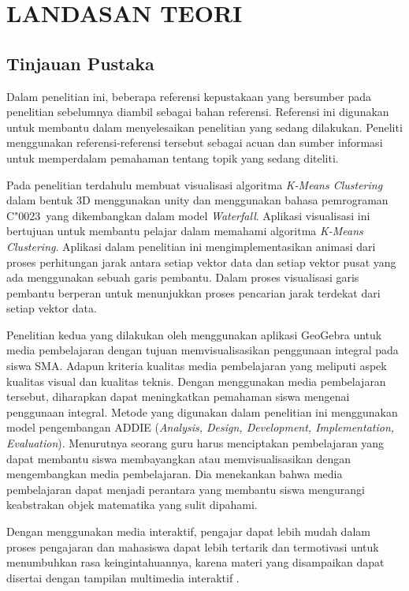 \chapter{LANDASAN TEORI}
\section{Tinjauan Pustaka}
Dalam penelitian ini, beberapa referensi kepustakaan yang bersumber pada penelitian sebelumnya diambil sebagai bahan referensi. Referensi ini digunakan untuk membantu dalam menyelesaikan penelitian yang sedang dilakukan. Peneliti menggunakan referensi-referensi tersebut sebagai acuan dan sumber informasi untuk memperdalam pemahaman tentang topik yang sedang diteliti.

Pada penelitian terdahulu \textcite{suryadibrata2020visualisasi} membuat visualisasi algoritma \textit{K-Means Clustering} dalam bentuk 3D menggunakan unity dan menggunakan bahasa pemrograman C\char"0023\ yang dikembangkan dalam model \textit{Waterfall}. Aplikasi visualisasi ini bertujuan untuk membantu pelajar dalam memahami algoritma \textit{K-Means Clustering}. Aplikasi dalam penelitian ini mengimplementasikan animasi dari proses perhitungan jarak antara setiap vektor data dan setiap vektor pusat yang ada menggunakan sebuah garis pembantu. Dalam proses visualisasi garis pembantu berperan untuk menunjukkan proses pencarian jarak terdekat dari setiap vektor data.

Penelitian kedua yang dilakukan oleh \textcite{zarkasyi2015pengembangan} menggunakan aplikasi GeoGebra untuk media pembelajaran dengan tujuan memvisualisasikan penggunaan integral pada siswa SMA. Adapun kriteria kualitas media pembelajaran yang meliputi aspek kualitas visual dan kualitas teknis. Dengan menggunakan media pembelajaran tersebut, diharapkan dapat meningkatkan pemahaman siswa mengenai penggunaan integral. Metode yang digunakan dalam penelitian ini menggunakan model pengembangan ADDIE (\textit{Analysis, Design, Development, Implementation, Evaluation}). Menurutnya seorang guru harus menciptakan pembelajaran yang dapat membantu siswa membayangkan atau memvisualisasikan dengan mengembangkan media pembelajaran. Dia menekankan bahwa media pembelajaran dapat menjadi perantara yang membantu siswa mengurangi keabstrakan objek matematika yang sulit dipahami.

Dengan menggunakan media interaktif, pengajar dapat lebih mudah dalam proses pengajaran dan mahasiswa dapat lebih tertarik dan termotivasi untuk menumbuhkan rasa keingintahuannya, karena materi yang disampaikan dapat disertai dengan tampilan multimedia interaktif \cite{maulana2021penerapan}.

